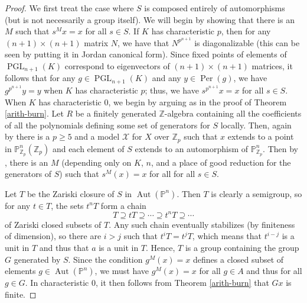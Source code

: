 \documentclass{amsart}
\DeclareMathOperator{\PGL}{PGL}
\newcommand{\bP}{\mathbb{P}}
\newcommand{\bZ} {\mathbb{Z}}
\DeclareMathOperator{\Aut}{Aut}
\DeclareMathOperator{\Per}{Per}
\newcommand{\cX}{\mathcal X}
\theoremstyle{definition}
\begin{document}
\begin{proof}
  

  
  We first treat the case where $S$ is composed entirely of
  automorphisms (but is not necessarily a group itself).  We will
  begin by showing that there is an $M$ such that $s^Mx = x$ for all
  $s \in S$.  If $K$ has characteristic $p$, then for any
  $(n+1) \times (n+1)$ matrix $N$, we have that $N^{p^{n+1}}$ is
  diagonalizable (this can be seen by putting it in Jordan canonical
  form).  Since fixed points of elements of $\PGL_{n+1}(K)$ correspond
  to eigenvectors of $(n+1) \times (n+1)$ matrices, it follows that
  for any $g \in \PGL_{n+1}(K)$ and any $y \in \Per(g)$, we have
  $g^{p^{n+1}} y = y$ when $K$ has characteristic $p$; thus, we have
  $s^{p^{n+1}} x = x$ for all $s \in S$.  When $K$ has characteristic
  $0$, we begin by arguing as in the proof of Theorem
  \ref{arith-burn}. Let $R$ be a finitely generated $\bZ$-algebra
  containing all
  the coefficients of all the polynomials defining some set of
  generators for $S$ locally.  Then, again by \cite[Proposition
  4.3]{BGT1} there is a $p \geq 5$ and a model $\cX$ for $X$ over
  $\bZ_p$ such that $x$ extends to a point in $\bP_{\bZ_p}^n(\bZ_p)$
  and each element of $S$ extends to an automorphism of
  $\bP_{\bZ_p}^n$.  Then by \cite[Theorem 1.1]{BGT2}, there is an $M$
  (depending only on $K$, $n$, and a place of good reduction for the
  generators of $S$) such that $s^M(x) = x$ for all for all $s \in S$.



  Let $T$ be the Zariski closure
  of $S$ in $\Aut(\bP^n)$.  Then $T$ is clearly a semigroup, so for
  any $t \in T$, the sets $t^n T$ form a chain
  \[ T \supseteq tT \supseteq \cdots \supseteq t^n T \supseteq
    \cdots \] of Zariski closed subsets of $T$.  Any such chain
  eventually stabilizes (by finiteness of dimension), so there are
  $i > j$ such that $t^i T = t^j T$, which means that $t^{i-j}$ is a
  unit in $T$ and thus that $a$ is a unit in $T$.  Hence, $T$ is a
  group containing the group $G$ generated by $S$.  Since the
  condition $g^M(x) = x$ defines a closed subset of elements
  $g \in\Aut(\bP^n)$, we must have $g^M(x) = x$ for all $g \in A$ and
  thus for all $g \in G$. In characteristic 0, it then follows from
  Theorem \ref{arith-burn} that $Gx$ is finite.


\end{proof}
\end{document}
